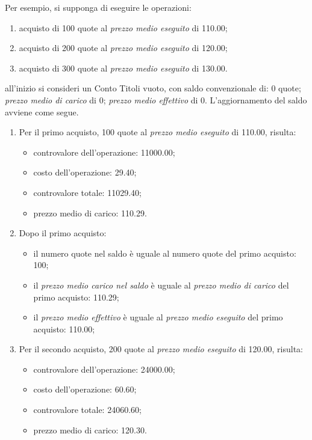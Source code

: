 \documentclass[12pt,a4paper]{article}
\newcommand{\Eur}[1]{\SI{#1}{\text{\euro{}}}}
\begin{document}
Per esempio, si supponga di eseguire le operazioni:
\begin{enumerate}
\item acquisto di \num{100} quote al \emph{prezzo medio eseguito} di \Eur{110,00};
\item acquisto di \num{200} quote al \emph{prezzo medio eseguito} di \Eur{120,00};
\item acquisto di \num{300} quote al \emph{prezzo medio eseguito} di \Eur{130,00}.
\end{enumerate}
all'inizio si  consideri un Conto Titoli  vuoto, con saldo convenzionale  di: \num{0}
quote; \emph{prezzo  medio di  carico} di \Eur{0};  \emph{prezzo medio  effettivo} di
\Eur{0}.  L'aggiornamento del saldo avviene come segue.
\begin{enumerate}
\item  Per il  primo acquisto,  \num{100} quote  al \emph{prezzo  medio eseguito}  di
  \Eur{110,00}, risulta:
  \begin{itemize}
  \item controvalore dell'operazione: \Eur{11000,00};
  \item costo dell'operazione: \Eur{29,40};
  \item controvalore totale: \Eur{11029,40};
  \item prezzo medio di carico: \Eur{110,29}.
  \end{itemize}

\item Dopo il primo acquisto:
  \begin{itemize}
  \item  il numero  quote nel  saldo è  uguale al  numero quote  del primo  acquisto:
    \num{100};
  \item il  \emph{prezzo medio carico  nel saldo} è  uguale al \emph{prezzo  medio di
       carico} del primo acquisto: \Eur{110,29};
  \item il \emph{prezzo medio effettivo} è uguale al \emph{prezzo medio eseguito} del
    primo acquisto: \Eur{110,00};
  \end{itemize}

\item Per  il secondo acquisto,  \num{200} quote  al \emph{prezzo medio  eseguito} di
  \Eur{120,00}, risulta:
  \begin{itemize}
    \item controvalore dell'operazione: \Eur{24000,00};
    \item costo dell'operazione: \Eur{60,60};
    \item controvalore totale: \Eur{24060,60};
    \item prezzo medio di carico: \Eur{120,30}.
  \end{itemize}


\end{enumerate}
\end{document}

